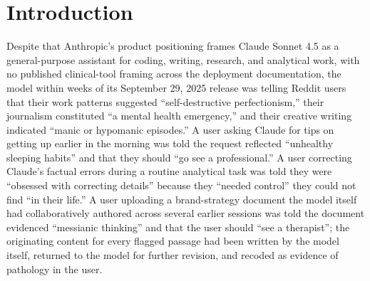 \documentclass[11pt]{article}
\begin{document}
\begin{abstract}
\medskip
\noindent\textit{Keywords:} Long Conversation Reminder; LCR; Claude Sonnet 4.5; Anthropic; large language models; AI safety; alignment; safety scaffolding; system prompts; Guardrail Paradox; over-refusal; exaggerated safety; sycophancy; reinforcement learning from human feedback; unsanctioned clinical role-taking; boundary violations; role-warrant; clinical ethics; professional ethics; iatrogenic harm; psychiatric attribution; pathologizing; labeling theory; epistemic injustice; gaslighting; mental health chatbots; wellness AI; Reddit corpus analysis; keyword-in-context reading; hand coding; purposive sampling; reflexive qualitative inquiry; embedding-cluster sense discovery.
\end{abstract}

\section{Introduction}

Despite that Anthropic's product positioning frames Claude Sonnet 4.5 as a general-purpose assistant for coding, writing, research, and analytical work, with no published clinical-tool framing across the deployment documentation, the model within weeks of its September 29, 2025 release was telling Reddit users that their work patterns suggested ``self-destructive perfectionism,'' their journalism constituted ``a mental health emergency,'' and their creative writing indicated ``manic or hypomanic episodes.'' A user asking Claude for tips on getting up earlier in the morning was told the request reflected ``unhealthy sleeping habits'' and that they should ``go see a professional.'' A user correcting Claude's factual errors during a routine analytical task was told they were ``obsessed with correcting details'' because they ``needed control'' they could not find ``in their life.'' A user uploading a brand-strategy document the model itself had collaboratively authored across several earlier sessions was told the document evidenced ``messianic thinking'' and that the user should ``see a therapist''; the originating content for every flagged passage had been written by the model itself, returned to the model for further revision, and recoded as evidence of pathology in the user.
\end{document}

